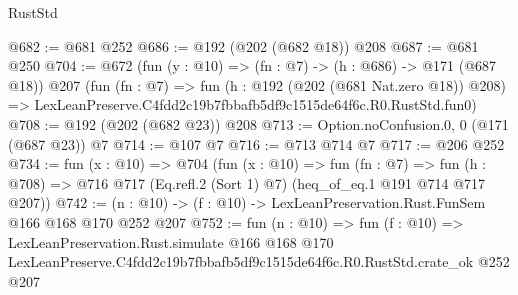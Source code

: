 \begin{lexlean}{RustStd}
\begin{coremodule}
@682 := @681 @252
@686 := @192 (@202 (@682 @18)) @208
@687 := @681 @250
@704 := @672
    (fun (y : @10) => (fn : @7) -> (h : @686) -> @171 (@687 @18))
    @207
    (fun (fn : @7) =>
    fun (h : @192 (@202 (@681 Nat.zero @18)) @208) =>
    LexLeanPreserve.C4fdd2c19b7fbbafb5df9c1515de64f6c.R0.RustStd.fun0)
@708 := @192 (@202 (@682 @23)) @208
@713 := Option.noConfusion.{0, 0} (@171 (@687 @23)) @7
@714 := @107 @7
@716 := @713 @714 @7
@717 := @206 @252
@734 := fun (x : @10) =>
  @704
    (fun (x : @10) =>
    fun (fn : @7) =>
    fun (h : @708) => @716 @717 (Eq.refl.{2} (Sort 1) @7) (heq_of_eq.{1} @191 @714 @717 @207))
@742 := (n : @10) -> (f : @10) -> LexLeanPreservation.Rust.FunSem @166 @168 @170 @252 @207
@752 := fun (n : @10) =>
  fun (f : @10) =>
  LexLeanPreservation.Rust.simulate
    @166
    @168
    @170
    LexLeanPreserve.C4fdd2c19b7fbbafb5df9c1515de64f6c.R0.RustStd.crate_ok
    @252
    @207
\end{coremodule}
\end{lexlean}
